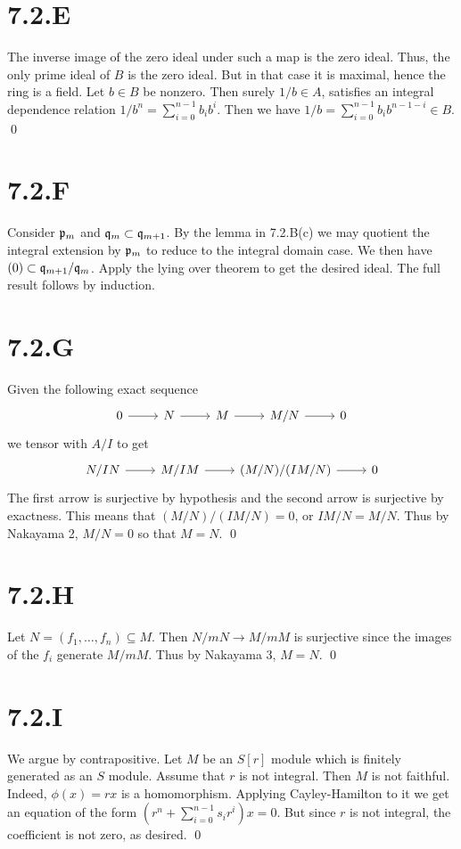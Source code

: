 \documentclass{article}
\begin{document}
\section{7.2.E}
The inverse image of the zero ideal under such a map is the zero ideal. Thus,
the only prime ideal of $B$ is the zero ideal. But in that
case it is maximal, hence the ring is a field. Let $b \in B$ be
nonzero. Then surely $1/b \in A$, satisfies an integral dependence
relation $1/b^n=\sum_{i=0}^{n-1} b_ib^i$. Then we have $1/b=\sum_{i=0}^{n-1} b_ib^{n-1-i} \in B$. \qed

\section{7.2.F}
Consider $\mathfrak{p}_m$ and $\mathfrak{q}_m \subset \mathfrak{q}_{m+1}$. By the lemma in
7.2.B(c) we may quotient the integral extension by $\mathfrak{p}_m$ to
reduce to the integral domain case. We then have $(0) \subset \mathfrak{q}_{m+1}/\mathfrak{q}_m$. Apply
the lying over theorem to get the desired ideal. The full result follows by
induction.

\section{7.2.G}
Given the following exact sequence \[
    \begin{tikzcd}
        0 \ar[r] & N \ar[r] & M \ar[r] & M/N \ar[r] & 0
    \end{tikzcd}
\] we tensor with
$A/I$ to get \[
    \begin{tikzcd}
        N/IN \ar[r] & M/IM \ar[r] & (M/N)/(IM/N) \ar[r] & 0
    \end{tikzcd}
\] The first arrow is
surjective by hypothesis and the second arrow is surjective by exactness. This
means that $(M/N)/(IM/N)=0$, or $IM/N=M/N$. Thus by
Nakayama 2, $M/N=0$ so that $M=N$. \qed

\section{7.2.H}
Let $N=(f_1, \dots, f_n) \subseteq M$. Then $N/mN \to M/mM$ is surjective since
the images of the $f_i$ generate $M/mM$.
Thus by Nakayama 3, $M=N$. \qed

\section{7.2.I}
We argue by contrapositive. Let $M$ be an
$S[r]$ module which is finitely generated as an
$S$ module. Assume that $r$ is not
integral. Then $M$ is not faithful. Indeed,
$\phi(x)=rx$ is a homomorphism. Applying Cayley-Hamilton to it we
get an equation of the form $(r^n+\sum_{i=0}^{n-1} s_ir^i)x=0$. But since
$r$ is not integral, the coefficient is not zero, as
desired. \qed
\end{document}
